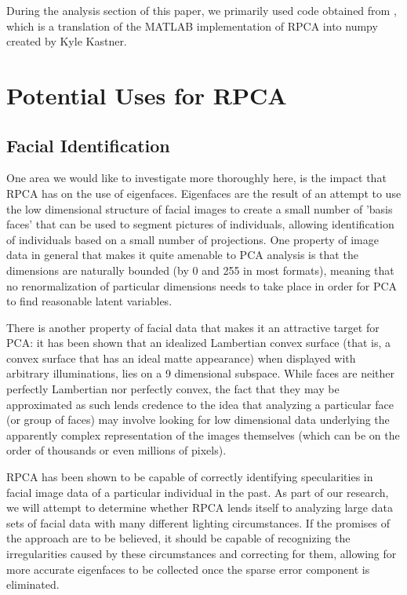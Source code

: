 \documentclass[11pt]{scrartcl} %
\theoremstyle{plain}
\begin{document}
During the analysis section of this paper, we primarily used code obtained from \cite{usedcode}, which is a translation of the MATLAB implementation of RPCA into numpy created by Kyle Kastner.

\section{Potential Uses for RPCA}

\subsection{Facial Identification}
One area we would like to investigate more thoroughly here, is the impact that RPCA has on the use of eigenfaces. Eigenfaces are the result of an attempt to use the low dimensional structure of facial images to create a small number of 'basis faces' that can be used to segment pictures of individuals, allowing identification of individuals based on a small number of projections. One property of image data in general that makes it quite amenable to PCA analysis is that the dimensions are naturally bounded (by 0 and 255 in most formats), meaning that no renormalization of particular dimensions needs to take place in order for PCA to find reasonable latent variables.

There is another property of facial data that makes it an attractive target for PCA: it has been shown that an idealized Lambertian convex surface (that is, a convex surface that has an ideal matte appearance) when displayed with arbitrary illuminations, lies on a 9 dimensional subspace\cite{lambertian}. While faces are neither perfectly Lambertian nor perfectly convex, the fact that they may be approximated as such lends credence to the idea that analyzing a particular face (or group of faces) may involve looking for low dimensional data underlying the apparently complex representation of the images themselves (which can be on the order of thousands or even millions of pixels).

RPCA has been shown to be capable of correctly identifying specularities in facial image data of a particular individual in the past\cite{rpca}. As part of our research, we will attempt to determine whether RPCA lends itself to analyzing large data sets of facial data with many different lighting circumstances. If the promises of the approach are to be believed, it should be capable of recognizing the irregularities caused by these circumstances and correcting for them, allowing for more accurate eigenfaces to be collected once the sparse error component is eliminated.
\end{document}

